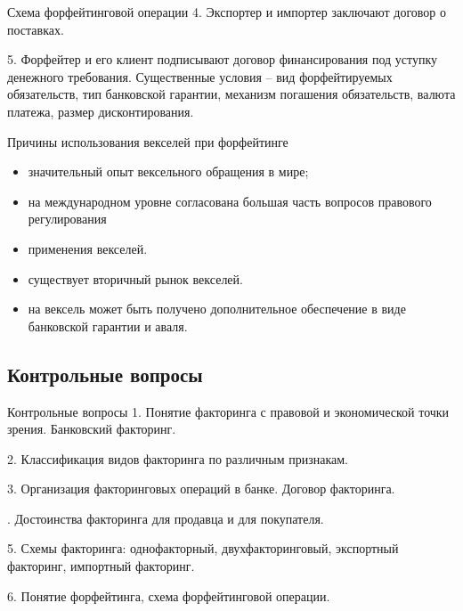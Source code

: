 \documentclass[_Banking_p3.tex]{subfiles}
\begin{document}
\begin{frame}{Схема форфейтинговой операции}
4. Экспортер и импортер заключают договор о поставках.

5. Форфейтер и его клиент подписывают договор финансирования под уступку денежного требования. Существенные условия – вид форфейтируемых обязательств, тип банковской гарантии, механизм погашения обязательств, валюта платежа, размер дисконтирования.
\end{frame}

\begin{frame}{Причины использования векселей при форфейтинге}
\begin{itemize}[<+->]

\item
значительный опыт вексельного обращения в мире;

\item
на международном уровне согласована большая часть вопросов правового регулирования 
\item
применения векселей.

\item
существует вторичный рынок векселей.

\item
на вексель может быть получено дополнительное обеспечение в виде банковской гарантии и аваля.

\end{itemize}
\end{frame}

\subsection{Контрольные вопросы}
\begin{frame}[ allowframebreaks ]{Контрольные вопросы}
1. Понятие факторинга с правовой и экономической точки зрения. Банковский факторинг.

2. Классификация видов факторинга по различным признакам.

3. Организация факторинговых операций в банке. Договор факторинга.

. Достоинства факторинга для продавца и для покупателя.

5. Схемы факторинга: однофакторный, двухфакторинговый, экспортный факторинг, импортный факторинг.

6. Понятие форфейтинга, схема форфейтинговой операции.

\end{frame}

\end{document}
